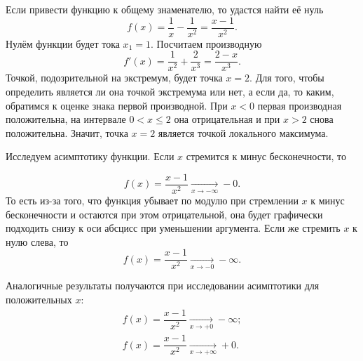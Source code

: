 \documentclass[12pt]{article}
\begin{document}
\par Если привести функцию к общему знаменателю, то удастся найти её нуль
\begin{equation}
	f(x) = \dfrac{1}{x} - \dfrac{1}{x^2} = \dfrac{x - 1}{x^2}.
\end{equation}
Нулём функции будет тока $x_1 = 1$. Посчитаем производную
\begin{equation}
	f'(x) = \dfrac{1}{x^2} + \dfrac{2}{x^3} = \dfrac{2-x}{x^3}.
\end{equation}
Точкой, подозрительной на экстремум, будет точка $x=2$. Для того, чтобы определить является ли она точкой экстремума или нет, а если да, то каким, обратимся к оценке знака первой производной. При $x<0$ первая производная положительна, на интервале $ 0 < x \le 2$ она отрицательная и при $x>2$ снова положительна. Значит, точка $x=2$ является точкой локального максимума.

\par Исследуем асимптотику функции. Если $x$ стремится к минус бесконечности, то 

\begin{equation}
	f(x) = \dfrac{x - 1}{x^2} \underset{x\rightarrow-\infty}{\longrightarrow} -0.
\end{equation}
То есть из\--за того, что функция убывает по модулю при стремлении $x$ к минус бесконечности и остаются при этом отрицательной, она будет графически подходить снизу к оси абсцисс при уменьшении аргумента. Если же стремить $x$ к нулю слева, то
\begin{equation}
	f(x) = \dfrac{x - 1}{x^2} \underset{x\rightarrow-0}{\longrightarrow} -\infty.
\end{equation}

Аналогичные результаты получаются при исследовании асимптотики для положительных $x$:
\begin{gather} 
f(x) = \dfrac{x - 1}{x^2} \underset{x\rightarrow+0}{\longrightarrow} -\infty; \\ 
f(x) = \dfrac{x - 1}{x^2} \underset{x\rightarrow +\infty}{\longrightarrow} +0.
\end{gather}
\end{document}
